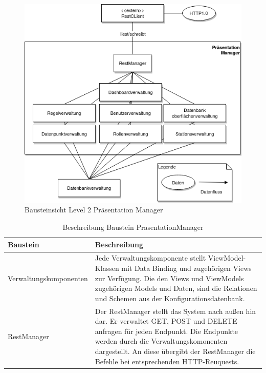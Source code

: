 \begin{figure}[h]
\centering
\includegraphics[width=1\textwidth]{Graphics/bausteinansicht_ebene_2_PrasentationManager.png}
\caption{Bausteinsicht Level 2 Pr\"asentation Manager}
\label{fig:bausteinsichtlvl2__PrasentationManager}
\end{figure}                 

\begin{table}[th]
	\begin{tabularx}{\textwidth}{|p{5cm}|X|}
		\hline
		Baustein & Beschreibung\\
		\hline
		Verwaltungskomponenten & Jede Verwaltungskomponente stellt ViewModel-Klassen mit Data Binding und zugehörigen Views zur Verfügung. Die den Views und ViewModels zugehörigen Models und Daten, sind die Relationen und Schemen aus der Konfigurationsdatenbank. \\
		\hline
		RestManager &  Der RestManager stellt das System nach außen hin dar. Er verwaltet GET, POST und DELETE anfragen für jeden Endpunkt. Die Endpunkte werden durch die Verwaltungskomonenten dargestellt. An diese übergibt der RestManager die Befehle bei entsprechenden HTTP-Reuquests.\\
		\hline
	\end{tabularx} 
	\caption{Beschreibung Baustein PrasentationManager}	\label{tab:Representation}
\end{table}

